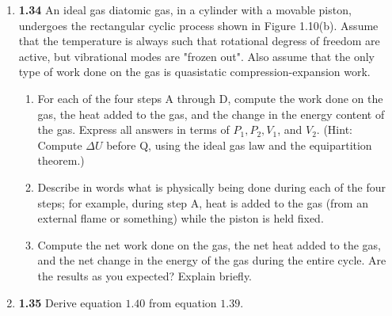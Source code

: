 \documentclass[fleqn]{article}
\begin{document}
\begin{enumerate}
    \item \textbf{1.34} An ideal gas diatomic gas, in a cylinder with a movable piston, undergoes the rectangular cyclic process
    shown in Figure 1.10(b). Assume that the temperature is always such that rotational degress of freedom are active, but vibrational
    modes are "frozen out". Also assume that the only type of work done on the gas is quasistatic compression-expansion work.
    \begin{enumerate}
      \item For each of the four steps A through D, compute the work done on the gas, the heat added to the gas, and the change in the energy
      content of the gas. Express all answers in terms of $P_1, P_2, V_1$, and $V_2$. (Hint: Compute $\Delta U$ before Q, using
      the ideal gas law and the equipartition theorem.)


      \item Describe in words what is physically being done during each of the four steps; for example, during step A, heat is added to the 
      gas (from an external flame or something) while the piston is held fixed.
    

      \item Compute the net work done on the gas, the net heat added to the gas, and the net change in the energy of the gas during the entire
      cycle. Are the results as you expected? Explain briefly.


    \end{enumerate}


    \item \textbf{1.35} Derive equation $1.40$ from equation $1.39$.
  

\end{enumerate}
\end{document}
